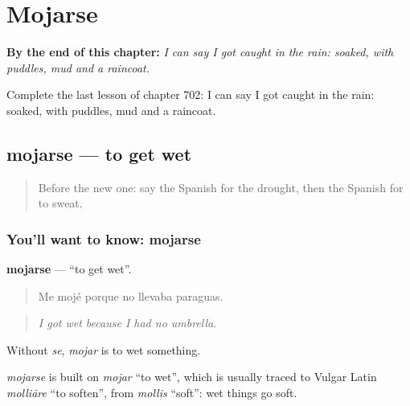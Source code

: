 
\chapter{Mojarse}
\label{ch:es-mojarse}

\begin{chapteropening}
\textbf{By the end of this chapter:} \emph{I can say I got caught in the rain: soaked, with puddles, mud and a raincoat.}

Complete the last lesson of chapter 702: I can say I got caught in the rain: soaked, with puddles, mud and a raincoat.
\end{chapteropening}

\section[mojarse]{mojarse — to get wet}

\label{lesson:ES-C702-mojarse}



\begin{quote}
Before the new one: say the Spanish for the drought, then the Spanish for to sweat.
\end{quote}

\subsection*{You'll want to know: mojarse}
\textbf{mojarse} — \textquotedblleft{}to get wet\textquotedblright{}.

\begin{quote}
Me mojé porque no llevaba paraguas.
\end{quote}

\begin{quote}
\emph{I got wet because I had no umbrella.}
\end{quote}

Without \emph{se}, \emph{mojar} is to wet something.

\begin{cousinweb}
\emph{mojarse} is built on \emph{mojar} \textquotedblleft{}to wet\textquotedblright{}, which is usually traced to Vulgar Latin \emph{molliāre} \textquotedblleft{}to soften\textquotedblright{}, from \emph{mollis} \textquotedblleft{}soft\textquotedblright{}: wet things go soft.
\end{cousinweb}

